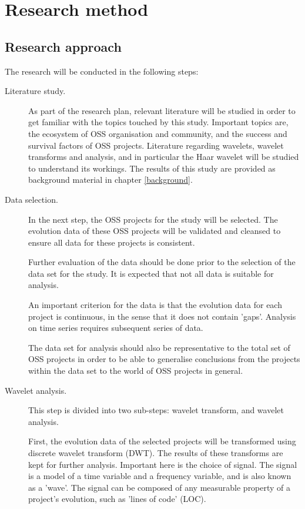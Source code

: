 \chapter{Research method}
\label{method}

\section{Research approach}
The research will be conducted in the following steps:
\begin{description}
	\item[Literature study.] As part of the research plan, relevant literature will
	be studied in order to get familiar with the topics touched by this
	study. Important topics are, the ecosystem of OSS organisation and community,
	and the success and survival factors of OSS projects. Literature regarding
	wavelets, wavelet transforms and analysis, and in particular the Haar wavelet
	will be studied to understand its workings. The results of this study are
	provided as background material in chapter \ref{background}.
	
	\item[Data selection.] In the next step, the OSS projects for the study will be
	selected. The evolution data of these OSS projects will be validated and
	cleansed to ensure all data for these projects is consistent.
	
	Further evaluation of the data should be done prior to the selection of the
	data set for the study. It is expected that not all data is suitable for
	analysis.
	
	An important criterion for the data is that the evolution data for each project
	is continuous, in the sense that it does not contain 'gaps'. Analysis on time
	series requires subsequent series of data.
	
	The data set for analysis should also be representative to the total set of
	OSS projects in order to be able to generalise conclusions from the
	projects within the data set to the world of OSS projects in general.
	
	\item[Wavelet analysis.] This step is divided into two sub-steps: wavelet
	transform, and wavelet analysis.
	
	First, the evolution data of the selected projects will be transformed using
	discrete wavelet transform (DWT). The results of these transforms are kept for
	further analysis. Important here is the choice of signal. The signal is a model
	of a time variable and a frequency variable, and is also known as a 'wave'. The
	signal can be composed of any measurable property of a project's evolution, such as
	'lines of code' (LOC).
	

\end{description}
